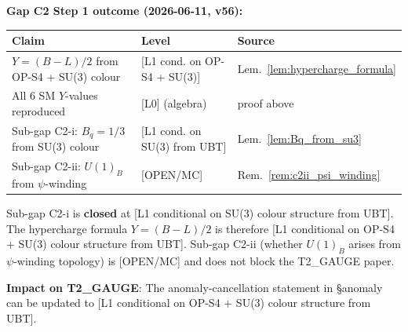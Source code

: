 \documentclass[12pt,a4paper]{article}
\theoremstyle{definition}
\theoremstyle{remark}
\begin{document}
\begin{resultbox}
  \textbf{Gap C2 Step 1 outcome (2026-06-11, v56):}

  \begin{center}
  \begin{tabular}{lll}
    \toprule
    \textbf{Claim} & \textbf{Level} & \textbf{Source} \\
    \midrule
    $Y = (B{-}L)/2$ from OP-S4 + SU(3) colour & [L1 cond. on OP-S4 + SU(3)] & Lem.~\ref{lem:hypercharge_formula} \\
    All 6 SM $Y$-values reproduced & [L0] (algebra) & proof above \\
    Sub-gap C2-i: $B_q=1/3$ from SU(3) colour & [L1 cond. on SU(3) from UBT] & Lem.~\ref{lem:Bq_from_su3} \\
    Sub-gap C2-ii: $U(1)_B$ from $\psi$-winding & [OPEN/MC] & Rem.~\ref{rem:c2ii_psi_winding} \\
    \bottomrule
  \end{tabular}
  \end{center}

  Sub-gap C2-i is \textbf{closed} at [L1 conditional on SU(3) colour structure from UBT].
  The hypercharge formula $Y=(B{-}L)/2$ is therefore
  [L1 conditional on OP-S4 + SU(3) colour structure from UBT].
  Sub-gap C2-ii (whether $U(1)_B$ arises from $\psi$-winding topology) is [OPEN/MC]
  and does not block the T2\_GAUGE paper.

  \textbf{Impact on T2\_GAUGE}: The anomaly-cancellation statement in §anomaly
  can be updated to [L1 conditional on OP-S4 + SU(3) colour structure from UBT].
\end{resultbox}

\ifdefined\INCLUDEMODE
\else
\end{document}
